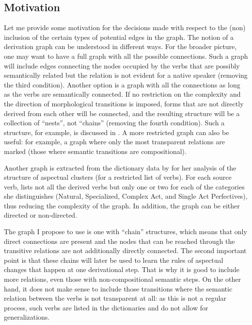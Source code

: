 \subsection{Motivation}\label{section:chains:motivation}
Let me provide some motivation for the decisions made with respect to the (non) inclusion of the certain types of potential edges in the graph. The notion of a derivation graph can be understood in different ways. For the broader picture, one may want to have a full graph with all the possible connections. Such a graph will include edges connecting the nodes occupied by the verbs that are possibly semantically related but the relation is not evident for a native speaker (removing the third condition). Another option is a graph with all the connections as long as the verbs are semantically connected. If no restriction on the complexity and the direction of morphological transitions is imposed, forms that are not directly derived from each other will be connected, and the resulting structure will be a collection of ``nests'', not ``chains'' (removing the fourth condition). Such a structure, for example, is discussed in \citealt{Janda:10}. A more restricted graph can also be useful: for example, a graph where only the most transparent relations are marked (those where semantic transitions are compositional). 

Another graph is extracted from the dictionary data by \citet{Janda:07a} for her analysis of the structure of aspectual clusters (for a restricted list of verbs). For each source verb, \citeauthor{Janda:07a} lists not all the derived verbs but only one or two for each of the categories she distinguishes (Natural, Specialized, Complex Act, and Single Act Perfectives), thus reducing the complexity of the graph. In addition, the graph can be either directed or non-directed. 
 
The graph I propose to use is one with ``chain'' structures, which means that only direct connections are present and the nodes that can be reached through the transitive relations are not additionally directly connected. The second important point is that these chains will later be used to learn the rules of aspectual changes that happen at one derivational step. That is why it is good to include more relations, even those with non-compositional semantic steps. On the other hand, it does not make sense to include those transitions where the semantic relation between the verbs is not transparent at all: as this is not a regular process, such verbs are listed in the dictionaries and do not allow for generalizations. 

